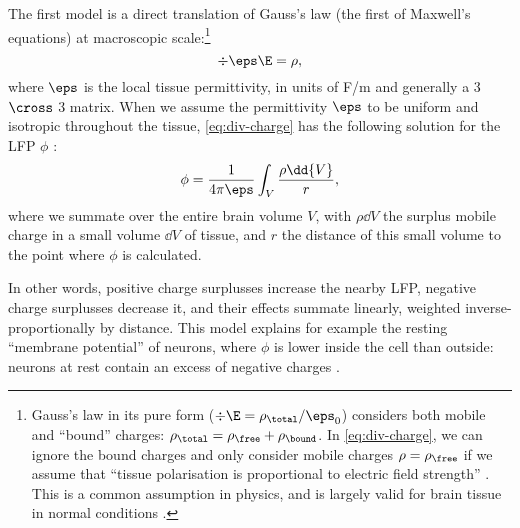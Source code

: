 The first model is a direct translation of Gauss's law (the first of Maxwell's equations) at macroscopic scale:\footnote{Gauss's law in its pure form ($\div{\E} = \rho_\total / \eps_0$) considers both mobile and ``bound'' charges: $\rho_\total = \rho_\free + \rho_\bound$. In \cref{eq:div-charge}, we can ignore the bound charges and only consider mobile charges $\rho = \rho_\free$ if we assume that ``tissue polarisation is proportional to electric field strength'' \cite{Feynman2013}. This is a common assumption in physics, and is largely valid for brain tissue in normal conditions \cite{Nunez2006}.}
%
\begin{equation}
\label{eq:div-charge}
\div{\eps \E} = \rho,
\end{equation}
%
where $\eps$ is the local tissue permittivity, in units of F/m and generally a 3 $\cross$ 3 matrix. When we assume the permittivity $\eps$ to be uniform and isotropic throughout the tissue\footnotemark{}, \cref{eq:div-charge} has the following solution for the LFP $\phi$ \cite{Feynman2013}:
%
\begin{equation}
\label{eq:phi-charge}
\phi = \frac{1}{4 \pi \eps} \int_V \frac{\rho \dd{V}}{r},
\end{equation}
%
where we summate over the entire brain volume $V$, with $\rho \dd{V}$ the surplus mobile charge in a small volume $\dd{V}$ of tissue, and $r$ the distance of this small volume to the point where $\phi$ is calculated.


In other words, positive charge surplusses increase the nearby LFP, negative charge surplusses decrease it, and their effects summate linearly, weighted inverse-proportionally by distance. This model explains for example the resting ``membrane potential'' of neurons, where $\phi$ is lower inside the cell than outside: neurons at rest contain an excess of negative charges \cite{Dayan2001b}.

